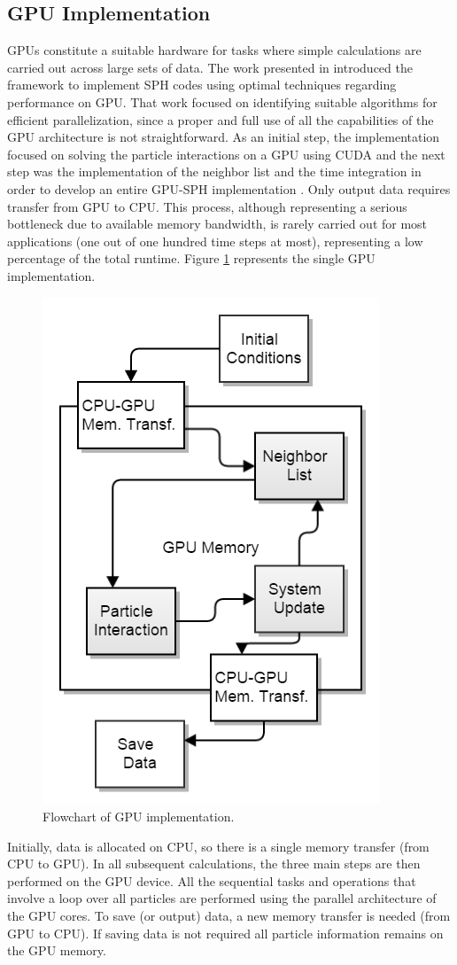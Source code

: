 \subsection{\ac{GPU} Implementation}
%
\ac{GPU}s constitute a suitable hardware for tasks where simple calculations are carried out across large sets of data. The work presented in \cite{Crespo-2009} introduced the framework to implement \ac{SPH} codes using optimal techniques regarding performance on \ac{GPU}. That work focused on identifying suitable algorithms for efficient parallelization, since a proper and full use of all the capabilities of the \ac{GPU} architecture is not straightforward. As an initial step, the implementation focused on solving the particle interactions on a \ac{GPU} using \ac{CUDA} and the next step was the implementation of the neighbor list and the time integration in order to develop an entire \ac{GPU}-\ac{SPH}  implementation \cite{Crespo-2011}. Only output data requires transfer from \ac{GPU} to \ac{CPU}. This process, although representing a serious bottleneck due to available memory bandwidth, is rarely carried out for most applications (one out of one hundred time steps at most), representing a low percentage of the total runtime. Figure \ref{fig:GPU_flowchart} represents the single \ac{GPU} implementation. 
%
\begin{figure}[ht!]
	\centering
	\includegraphics[width=0.35\linewidth]{Figures/4.Chapter/GPU_diagram.png}
	\caption{\small{Flowchart of \ac{GPU} implementation.}}
	\label{fig:GPU_flowchart} 
\end{figure}
%

Initially, data is allocated on \ac{CPU}, so there is a single memory transfer (from \ac{CPU} to \ac{GPU}). In all subsequent calculations, the three main steps are then performed on the \ac{GPU} device. All the sequential tasks and operations that involve a loop over all particles are performed using the parallel architecture of the \ac{GPU} cores. To save (or output) data, a new memory transfer is needed (from \ac{GPU} to \ac{CPU}). If saving data is not required all particle information remains on the \ac{GPU} memory.

